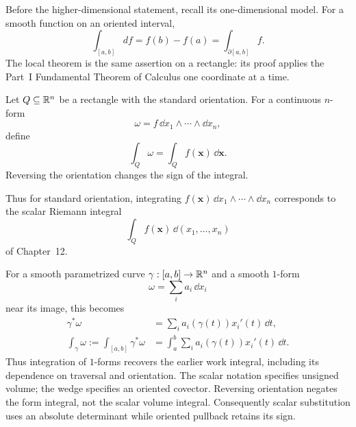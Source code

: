 Before the higher-dimensional statement, recall its one-dimensional model.
For a smooth function on an oriented interval,
\[
\int_{[a,b]}df=f(b)-f(a)=\int_{\partial[a,b]}f.
\]
The local theorem is the same assertion on a rectangle: its proof applies
the Part~I Fundamental Theorem of Calculus one coordinate at a time.

\begin{definition}
Let $Q\subseteq\mathbb{R}^n$ be a rectangle with the standard orientation.  For a
continuous $n$-form
\[
\omega=f\,\dd x_1\wedge\cdots\wedge\dd x_n,
\]
define
\[
\int_Q\omega=\int_Qf(\mathbf{x})\,\dd\mathbf{x}.
\]
Reversing the orientation changes the sign of the integral.
\end{definition}

Thus for standard orientation, integrating
$f(\mathbf{x})\,\dd x_1\wedge\cdots\wedge\dd x_n$ corresponds to the scalar
Riemann integral
\[
\int_Q f(\mathbf{x})\,\dd(x_1,\ldots,x_n)
\]
 of Chapter~12.

For a smooth parametrized curve $\gamma:[a,b]\to\mathbb{R}^n$ and a smooth
$1$-form
\[
\omega=\sum_i a_i\,\dd x_i
\]
 near its image, this becomes
\[
\begin{aligned}
\gamma^*\omega&=\sum_i a_i(\gamma(t))x_i'(t)\,\dd t,\\
\int_\gamma\omega:=\int_{[a,b]}\gamma^*\omega
&=\int_a^b\sum_i a_i(\gamma(t))x_i'(t)\,\dd t.
\end{aligned}
\]
Thus integration of $1$-forms recovers the earlier work integral, including
its dependence on traversal and orientation.
The scalar notation specifies unsigned volume; the wedge specifies an
oriented covector. Reversing orientation negates the form integral, not
the scalar volume integral. Consequently scalar substitution uses an
absolute determinant while oriented pullback retains its sign.

